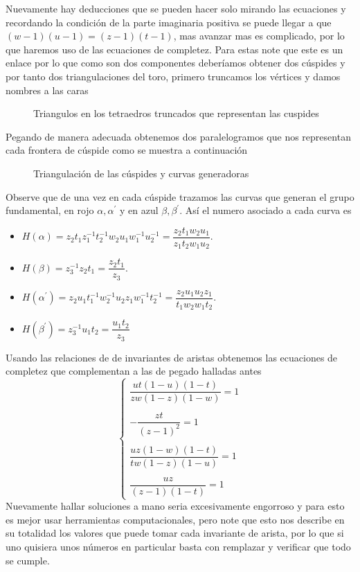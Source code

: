 Nuevamente hay deducciones que se pueden hacer solo mirando las ecuaciones y recordando la condición de la parte imaginaria positiva se puede llegar a que $(w-1)(u-1)=(z-1)(t-1)$, mas avanzar mas es complicado, por lo que haremos uso de las ecuaciones de completez. Para estas note que este es un enlace por lo que como son dos componentes deberíamos obtener dos cúspides y por tanto dos triangulaciones del toro, primero truncamos los vértices y damos nombres a las caras 
\begin{figure}[H]
\centering

    \caption{Triangulos en los tetraedros truncados que representan las cuspides}
\end{figure}
Pegando de manera adecuada obtenemos dos paralelogramos que nos representan cada frontera de cúspide como se muestra a continuación
\begin{figure}[H]
\centering

    \caption{Triangulación de las cúspides y curvas generadoras}
\end{figure}
Observe que de una vez en cada cúspide trazamos las curvas que generan el grupo fundamental, en rojo $\alpha,\alpha^\prime$ y en azul $\beta,\beta^\prime$. Así el numero asociado a cada curva es
\begin{itemize}
    \item $H(\alpha)=z_2t_1z_1^{-1}t_2^{-1}w_2u_1w_1^{-1}u_2^{-1}=\dfrac{z_2t_1w_2u_1}{z_1t_2w_1u_2}.$
    \item $H(\beta)=z_3^{-1}z_2t_1=\dfrac{z_2t_1}{z_3}.$
    \item $H(\alpha^\prime)=z_2u_1t_1^{-1}w_2^{-1}u_2z_1w_1^{-1}t_2^{-1}=\dfrac{z_2u_1u_2z_1}{t_1w_2w_1t_2}.$
    \item $H(\beta^\prime)=z_3^{-1}u_1t_2=\dfrac{u_1t_2}{z_3}$
\end{itemize}
Usando las relaciones de de invariantes de aristas obtenemos las ecuaciones de completez que complementan a las de pegado halladas antes
$$\begin{cases}
    \dfrac{ut(1-u)(1-t)}{zw(1-z)(1-w)}=1\\
    \\
    -\dfrac{zt}{(z-1)^2}=1\\
    \\
    \dfrac{uz(1-w)(1-t)}{tw(1-z)(1-u)}=1\\
    \\
    \dfrac{uz}{(z-1)(1-t)}=1
\end{cases}$$
Nuevamente hallar soluciones a mano seria excesivamente engorroso y para esto es mejor usar herramientas computacionales, pero note que esto nos describe en su totalidad los valores que puede tomar cada invariante de arista, por lo que si uno quisiera unos números en particular basta con remplazar y verificar que todo se cumple.